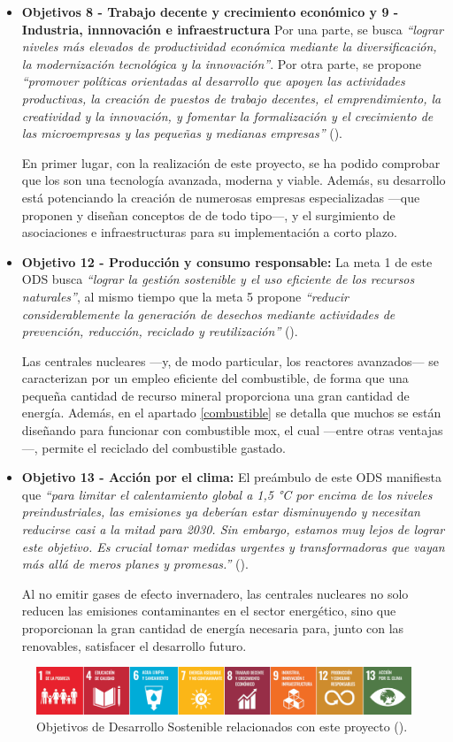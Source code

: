 \begin{itemize}
    \item \textbf{Objetivos 8 - Trabajo decente y crecimiento económico y 9 - Industria, innnovación e infraestructura} Por una parte, se busca \textit{``lograr niveles más elevados de productividad económica mediante la diversificación, la modernización tecnológica y la innovación''}. Por otra parte, se propone \textit{``promover políticas orientadas al desarrollo que apoyen las actividades productivas, la creación de puestos de trabajo decentes, el emprendimiento, la creatividad y la innovación, y fomentar la formalización y el crecimiento de las microempresas y las pequeñas y medianas empresas''} (\cite{ODS}).
    
    En primer lugar, con la realización de este proyecto, se ha podido comprobar que los  son una tecnología avanzada, moderna y viable. Además, su desarrollo está potenciando la creación de numerosas empresas especializadas ---que proponen y diseñan conceptos de  de todo tipo---, y el surgimiento de asociaciones e infraestructuras para su implementación a corto plazo.

    \item \textbf{Objetivo 12 - Producción y consumo responsable:} La meta 1 de este ODS busca \textit{``lograr la gestión sostenible y el uso eficiente de los recursos naturales''}, al mismo tiempo que la meta 5 propone \textit{``reducir considerablemente la generación de desechos mediante actividades de prevención, reducción, reciclado y reutilización''} (\cite{ODS}).
    
    Las centrales nucleares ---y, de modo particular, los reactores avanzados--- se caracterizan por un empleo eficiente del combustible, de forma que una pequeña cantidad de recurso mineral proporciona una gran cantidad de energía. Además, en el apartado \ref{combustible} se detalla que muchos  se están diseñando para funcionar con combustible \acrshort{mox}, el cual ---entre otras ventajas---, permite el reciclado del combustible gastado. 
    
    \item \textbf{Objetivo 13 - Acción por el clima:} El preámbulo de este ODS manifiesta que \textit{``para limitar el calentamiento global a 1,5 °C por encima de los niveles preindustriales, las emisiones ya deberían estar disminuyendo y necesitan reducirse casi a la mitad para 2030. Sin embargo, estamos muy lejos de lograr este objetivo.
    Es crucial tomar medidas urgentes y transformadoras que vayan más allá de meros planes y promesas.''} (\cite{ODS}).

    Al no emitir gases de efecto invernadero, las centrales nucleares no solo reducen las emisiones contaminantes en el sector energético, sino que proporcionan la gran cantidad de energía necesaria para, junto con las renovables, satisfacer el desarrollo futuro.
\end{itemize}

\begin{figure}[h!]
    \centering
    \includegraphics[width=\textwidth]{content/figures/ODS_TFG.png}
    \caption{Objetivos de Desarrollo Sostenible relacionados con este proyecto (\cite{ODS}).}
    \label{fig:ods_tfg}
  \end{figure}